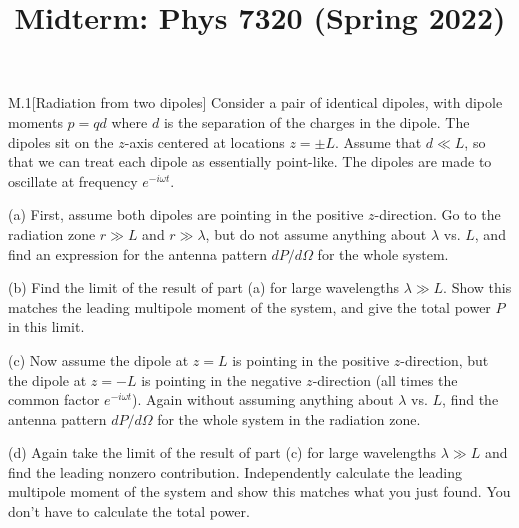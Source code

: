 \documentclass[12pt]{article}
\title{Midterm: Phys 7320 (Spring 2022)}
\begin{document}
\maketitle
\begin{problem}{M.1}[Radiation from two dipoles]
Consider a pair of identical dipoles, with dipole moments $p=qd$ where $d$ is
the separation of the charges in the dipole. The dipoles sit on the $z$-axis
centered at locations $z=\pm L$. Assume that $d\ll L$, so that we can treat each
dipole as essentially point-like. The dipoles are made to oscillate at frequency
$e^{-i\omega t}$.

(a) First, assume both dipoles are pointing in the positive $z$-direction. Go to
the radiation zone $r\gg L$ and $r\gg \lambda$, but do not assume anything about
$\lambda$ vs. $L$, and find an expression for the antenna pattern $dP/d\Omega$
for the whole system.

(b) Find the limit of the result of part (a) for large wavelengths $\lambda\gg
L$. Show this matches the leading multipole moment of the system, and give the
total power $P$ in this limit.

(c) Now assume the dipole at $z=L$ is pointing in the positive $z$-direction,
but the dipole at $z=-L$ is pointing in the negative $z$-direction (all times
the common factor $e^{-i\omega t}$). Again without assuming anything about
$\lambda$ vs. $L$, find the antenna pattern $dP/d\Omega$ for the whole system in
the radiation zone.

(d) Again take the limit of the result of part (c) for large wavelengths
$\lambda\gg L$ and find the leading nonzero contribution. Independently
calculate the leading multipole moment of the system and show this matches what
you just found. You don't have to calculate the total power.
\begin{solution}
\end{solution}
\end{problem}
\newpage
\end{document}
